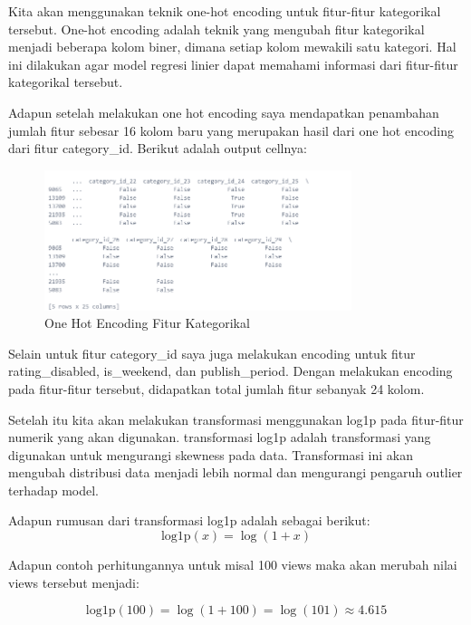 Kita akan menggunakan teknik one-hot encoding untuk fitur-fitur kategorikal tersebut. One-hot encoding adalah teknik yang mengubah fitur kategorikal menjadi beberapa kolom biner, dimana setiap kolom mewakili satu kategori. Hal ini dilakukan agar model regresi linier dapat memahami informasi dari fitur-fitur kategorikal tersebut. 

Adapun setelah melakukan one hot encoding saya mendapatkan penambahan jumlah fitur sebesar 16 kolom baru yang merupakan hasil dari one hot encoding dari fitur category\_id. Berikut adalah output cellnya:

\begin{figure}[ht]
    \centering
    \includegraphics[width=0.8\textwidth]{gambar/onehot.png}
    \caption{One Hot Encoding Fitur Kategorikal}
    \label{fig:one_hot_encoding}
\end{figure}

Selain untuk fitur category\_id saya juga melakukan encoding untuk fitur rating\_disabled, is\_weekend, dan publish\_period. Dengan melakukan encoding pada fitur-fitur tersebut, didapatkan total jumlah fitur sebanyak 24 kolom. 

Setelah itu kita akan melakukan transformasi menggunakan log1p pada fitur-fitur numerik yang akan digunakan. transformasi log1p adalah transformasi yang digunakan untuk mengurangi skewness pada data. Transformasi ini akan mengubah distribusi data menjadi lebih normal dan mengurangi pengaruh outlier terhadap model.

Adapun rumusan dari transformasi log1p adalah sebagai berikut:
\begin{equation}
    \text{log1p}(x) = \log(1 + x)
\end{equation}

Adapun contoh perhitungannya untuk misal 100 views maka akan merubah nilai views tersebut menjadi:

\begin{equation}
    \text{log1p}(100) = \log(1 + 100) = \log(101) \approx 4.615
\end{equation}

